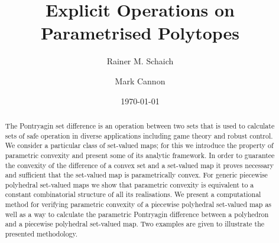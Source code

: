 \documentclass[smallextended]{svjour3}       %
\numberwithin{equation}{section}
\begin{document}
\title{Explicit Operations on Parametrised Polytopes}%


\author{Rainer M. Schaich
\and 
Mark Cannon}



\date{\today}

\maketitle


\begin{abstract}
The Pontryagin set difference is an operation between two sets that is used to calculate sets of safe operation in diverse applications including game theory and robust control.
%
We consider a particular class of set-valued maps; for this we introduce the property of parametric convexity and present some of its analytic framework.
%
In order to guarantee the convexity of the difference of a convex set and a set-valued map it proves necessary and sufficient that the set-valued map is parametrically convex.
%
For generic piecewise polyhedral set-valued maps we show that parametric convexity is equivalent to a constant combinatorial structure of all its realisations.
%
We present a computational method for verifying parametric convexity of a piecewise polyhedral set-valued map as well as a way to calculate the parametric Pontryagin difference between a polyhedron and a piecewise polyhedral set-valued map.
%
Two examples are given to illustrate the presented methodology.


\end{abstract}
\end{document}
